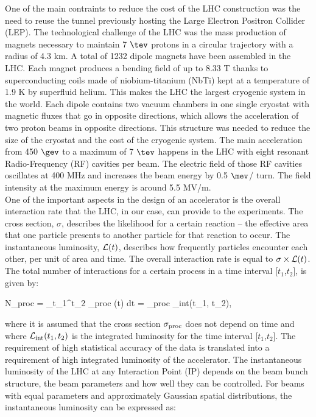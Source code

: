 One of the main contraints to reduce the cost of the LHC construction was the need to reuse the tunnel previously hosting the Large Electron Positron Collider (LEP).  The technological challenge of the LHC was the mass production of magnets necessary to maintain 7 $\tev$ protons in a circular trajectory with a radius of 4.3 km. A total of 1232 dipole magnets have been assembled in the LHC. Each magnet produces a bending field of up to 8.33 T thanks to superconducting coils made of niobium-titanium (NbTi) kept at a temperature of 1.9 K by superfluid helium. This makes the LHC the largest cryogenic system in the world. Each dipole contains two vacuum chambers in one single cryostat with magnetic fluxes that go in opposite directions, which allows the acceleration of two proton beams in opposite directions. This structure was needed to reduce the size of the cryostat and the cost of the cryogenic system.  The main acceleration from 450 $\gev$ to a maximum of 7 $\tev$  happens in the LHC with eight resonant Radio-Frequency (RF) cavities per beam. The electric field of those RF cavities oscillates at 400 MHz and increases the beam energy by 0.5 $\mev$/ turn. The field intensity at the maximum energy is around 5.5 MV/m.\\ \indent One of the important aspects in the design of an accelerator is the overall interaction rate that the LHC, in our case, can provide to the experiments.
The cross section, $\sigma$, describes the likelihood for a certain reaction -- the effective area that one particle presents to another particle for that reaction to occur. The instantaneous luminosity, $\mathcal{L}(t)$, describes how frequently particles encounter each other, per unit of area and time. The overall interaction rate is equal to  $\sigma \times \mathcal{L}(t)$. The total number of interactions for a certain process in a time interval [$t_{1}$,$t_{2}$], is given by:

\be
N_{\rm proc} = \int_{t_{1}}^{t_{2}} \sigma_{\rm proc} \times \lag(t) dt = \sigma_{\rm proc} \times \lag_{\rm int}(t_{1}, t_{2}),
\label{sec:det:eq:Nint}
\ee

\noindent where it is assumed that the cross section $\sigma_{\rm proc}$ does not depend on time and where $\mathcal{L}_{\rm int}(t_{1}, t_{2})$ is the integrated luminosity for the time interval [$t_{1}$,$t_{2}$]. The requirement of high statistical accuracy of the data is translated into a requirement of high integrated luminosity of the accelerator. The instantaneous luminosity of the LHC at any Interaction Point (IP) depends on the beam bunch structure, the beam parameters and how well they can be controlled. For beams with equal parameters and approximately Gaussian spatial distributions, the instantaneous luminosity can be expressed as:

